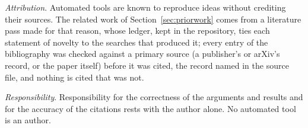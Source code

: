 \documentclass[11pt]{amsart}
\theoremstyle{definition}
\theoremstyle{remark}
\newcommand{\para}[1]{\par\smallskip\noindent\textit{#1}.\enspace}
\begin{document}
\para{Attribution}
Automated tools are known to reproduce ideas without crediting their
sources. The related work of Section~\ref{sec:priorwork} comes from a
literature pass made for that reason, whose ledger, kept in the
repository, ties each statement of novelty to the searches that produced
it; every entry of the bibliography was checked against a primary source
(a publisher's or arXiv's record, or the paper itself) before it was
cited, the record named in the source file, and nothing is cited that was
not.

\para{Responsibility}
Responsibility for the correctness of the arguments and results and for
the accuracy of the citations rests with the author alone. No automated
tool is an author.



\end{document}
